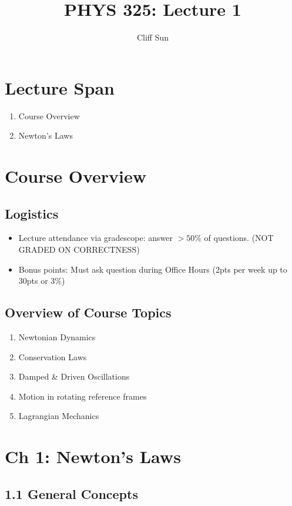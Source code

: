 \documentclass{article}
\title{PHYS 325: Lecture 1}
\author{Cliff Sun}
\newtheorem{one minute paper}[theorem]{One Minute Paper}
\begin{document}
\maketitle

\section*{Lecture Span}
\begin{enumerate}
    \item Course Overview
    \item Newton's Laws
\end{enumerate}

\section*{Course Overview}

\subsection*{Logistics}
\begin{itemize}
    \item Lecture attendance via gradescope: answer $>50\%$ of questions. (NOT GRADED ON CORRECTNESS)
    \item Bonus points: Must ask question during Office Hours (2pts per week up to 30pts or $3\%$)
\end{itemize}

\subsection*{Overview of Course Topics}
\begin{enumerate}
    \item Newtonian Dynamics
    \item Conservation Laws
    \item Damped \& Driven Oscillations
    \item Motion in rotating reference frames
    \item Lagrangian Mechanics
\end{enumerate}

\section*{Ch 1: Newton's Laws}

\subsection*{1.1 General Concepts}
\end{document}

